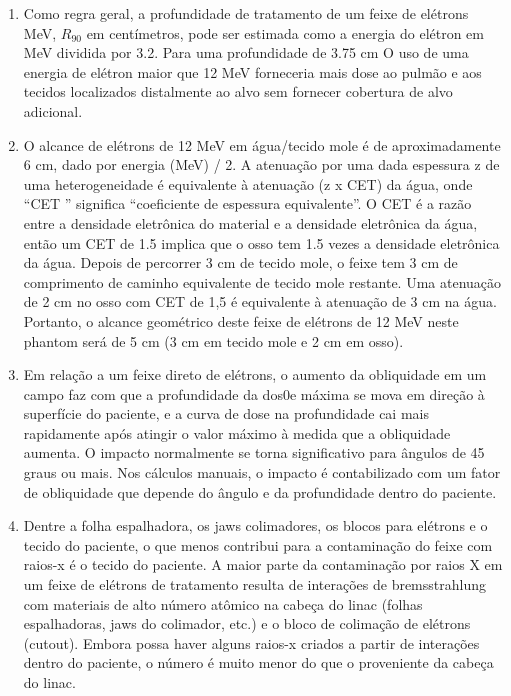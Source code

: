 \documentclass[11pt,a4paper]{article}
\begin{document}
\begin{enumerate}
        \item Como regra geral, a profundidade de tratamento de um feixe de elétrons MeV, $R_{90}$ em centímetros, pode ser estimada como a energia do elétron em MeV dividida por 3.2. Para uma profundidade de 3.75 cm O uso de uma energia de elétron maior que 12 MeV forneceria mais dose ao pulmão e aos tecidos localizados distalmente ao alvo sem fornecer cobertura de alvo adicional.

        \item O alcance de elétrons de 12 MeV em água/tecido mole é de aproximadamente 6 cm, dado por energia (MeV) / 2. A atenuação por uma dada espessura z de uma heterogeneidade é equivalente à atenuação (z x CET) da água, onde “CET ” significa “coeficiente de espessura equivalente”. O CET é a razão entre a densidade eletrônica do material e a densidade eletrônica da água, então um CET de 1.5 implica que o osso tem 1.5 vezes a densidade eletrônica da água. Depois de percorrer 3 cm de tecido mole, o feixe tem 3 cm de comprimento de caminho equivalente de tecido mole restante. Uma atenuação de 2 cm no osso com CET de 1,5 é equivalente à atenuação de 3 cm na água. Portanto, o alcance geométrico deste feixe de elétrons de 12 MeV neste phantom será de 5 cm (3 cm em tecido mole e 2 cm em osso).
        
        \item Em relação a um feixe direto de elétrons, o aumento da obliquidade em um campo faz com que a profundidade da dos0e máxima se mova em direção à superfície do paciente, e a curva de dose na profundidade cai mais rapidamente após atingir o valor máximo à medida que a obliquidade aumenta. O impacto normalmente se torna significativo para ângulos de 45 graus ou mais. Nos cálculos manuais, o impacto é contabilizado com um fator de obliquidade que depende do ângulo e da profundidade dentro do paciente.

        \item Dentre a folha espalhadora, os jaws colimadores, os blocos para elétrons e o tecido do paciente, o que menos contribui para a contaminação do feixe com raios-x é o tecido do paciente. A maior parte da contaminação por raios X em um feixe de elétrons de tratamento resulta de interações de bremsstrahlung com materiais de alto número atômico na cabeça do linac (folhas espalhadoras, jaws do colimador, etc.) e o bloco de colimação de elétrons (cutout). Embora possa haver alguns raios-x criados a partir de interações dentro do paciente, o número é muito menor do que o proveniente da cabeça do linac.


\end{enumerate}
\end{document}
